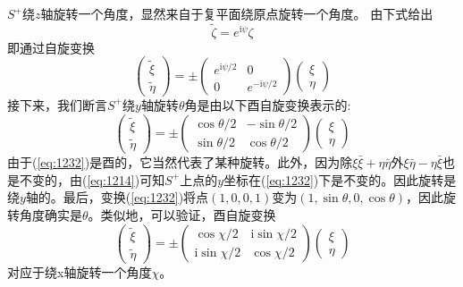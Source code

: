 \documentclass[utf8]{ctexbook}
\numberwithin{equation}{section}
\begin{document}
$S^+$绕$z$轴旋转一个角度，显然来自于复平面绕原点旋转一个角度。
由下式给出
\begin{equation}
    \tilde{\zeta}=e^{\mathrm{i}\psi}\zeta\label{eq:1230}
\end{equation}
即通过自旋变换
\begin{equation}
    \begin{pmatrix}
        \tilde{\xi}\\\tilde{\eta}
    \end{pmatrix}=\pm \begin{pmatrix}
        e^{\mathrm{i}\psi/2}&0\\0&e^{-\mathrm{i}\psi/2}
    \end{pmatrix}\begin{pmatrix}
        \xi\\\eta
    \end{pmatrix}\label{eq:1231}
\end{equation}
接下来，我们断言$S^+$绕$y$轴旋转$\theta$角是由以下酉自旋变换表示的:
\begin{equation}
    \begin{pmatrix}
        \tilde{\xi}\\\tilde{\eta}
    \end{pmatrix}=\pm \begin{pmatrix}
        \cos\theta/2&-\sin\theta/2\\\sin\theta/2&\cos\theta/2
    \end{pmatrix}\begin{pmatrix}
        \xi\\\eta
    \end{pmatrix}\label{eq:1232}
\end{equation}
由于(\ref{eq:1232})是酉的，它当然代表了某种旋转。此外，因为除$\xi\bar{\xi}+\eta\bar{\eta}$外$\xi\bar{\eta}-\eta\bar{\xi}$也是不变的，由(\ref{eq:1214})可知$S^+$上点的$y$坐标在(\ref{eq:1232})下是不变的。因此旋转是绕$y$轴的。最后，变换(\ref{eq:1232})将点$(1,0,0,1)$变为$(1,\sin\theta,0, \cos \theta)$，因此旋转角度确实是$\theta$。类似地，可以验证，酉自旋变换
\begin{equation}
    \begin{pmatrix}
        \tilde{\xi}\\\tilde{\eta}
    \end{pmatrix}=\pm \begin{pmatrix}
        \cos\chi /2&\mathrm{i}\sin\chi /2\\\mathrm{i}\sin\chi /2&\cos\chi /2
    \end{pmatrix}\begin{pmatrix}
        \xi\\\eta
    \end{pmatrix}\label{eq:1233}
\end{equation}
对应于绕x轴旋转一个角度$\chi$。
\end{document}
